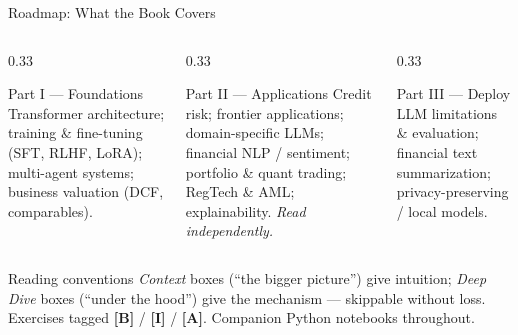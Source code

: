 \documentclass[9pt,t]{beamer}
\begin{document}
\begin{frame}{Roadmap: What the Book Covers}

\begin{columns}[T]
\begin{column}{0.33\textwidth}
\begin{block}{Part I --- Foundations}
Transformer architecture; training \& fine-tuning (SFT, RLHF, LoRA); multi-agent
systems; business valuation (DCF, comparables).
\end{block}
\end{column}
\begin{column}{0.33\textwidth}
\begin{block}{Part II --- Applications}
Credit risk; frontier applications; domain-specific LLMs; financial NLP /
sentiment; portfolio \& quant trading; RegTech \& AML; explainability.
\emph{Read independently.}
\end{block}
\end{column}
\begin{column}{0.33\textwidth}
\begin{block}{Part III --- Deploy}
LLM limitations \& evaluation; financial text summarization;
privacy-preserving / local models.
\end{block}
\end{column}
\end{columns}

\medskip
\begin{block}{Reading conventions}
\emph{Context} boxes (``the bigger picture'') give intuition; \emph{Deep Dive}
boxes (``under the hood'') give the mechanism --- skippable without loss.
Exercises tagged \textbf{[B]} / \textbf{[I]} / \textbf{[A]}. Companion Python notebooks throughout.
\end{block}
\end{frame}
\end{document}
